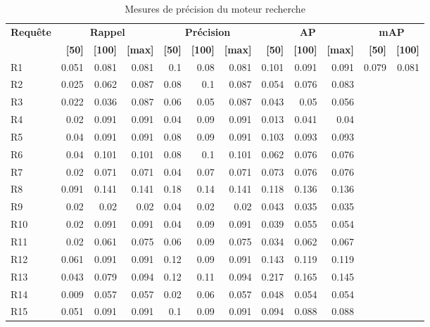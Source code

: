 \begin{table}[H]
\centering
\begin{tabular}{l|rrr|rrr|rrr|rr}
\toprule
\textbf{Requête} & \multicolumn{3}{c}{\textbf{Rappel}} & \multicolumn{3}{c}{\textbf{Précision}} & \multicolumn{3}{c}{\textbf{AP}} & \multicolumn{2}{c}{\textbf{mAP}} \\
 & \textbf{[50]} & \textbf{[100]} & \textbf{[max]} & \textbf{[50]} & \textbf{[100]} & \textbf{[max]} & \textbf{[50]} & \textbf{[100]} & \textbf{[max]} & \textbf{[50]} & \textbf{[100]} \\
\midrule
R1 & 0.051 & 0.081 & 0.081 & 0.1 & 0.08 & 0.081 & 0.101 & 0.091 & 0.091 & \multirow{15}{*}{0.079} & \multirow{15}{*}{0.081} \\
R2 & 0.025 & 0.062 & 0.087 & 0.08 & 0.1 & 0.087 & 0.054 & 0.076 & 0.083 \\
R3 & 0.022 & 0.036 & 0.087 & 0.06 & 0.05 & 0.087 & 0.043 & 0.05 & 0.056 \\
R4 & 0.02 & 0.091 & 0.091 & 0.04 & 0.09 & 0.091 & 0.013 & 0.041 & 0.04 \\
R5 & 0.04 & 0.091 & 0.091 & 0.08 & 0.09 & 0.091 & 0.103 & 0.093 & 0.093 \\
R6 & 0.04 & 0.101 & 0.101 & 0.08 & 0.1 & 0.101 & 0.062 & 0.076 & 0.076 \\
R7 & 0.02 & 0.071 & 0.071 & 0.04 & 0.07 & 0.071 & 0.073 & 0.076 & 0.076 \\
R8 & 0.091 & 0.141 & 0.141 & 0.18 & 0.14 & 0.141 & 0.118 & 0.136 & 0.136 \\
R9 & 0.02 & 0.02 & 0.02 & 0.04 & 0.02 & 0.02 & 0.043 & 0.035 & 0.035 \\
R10 & 0.02 & 0.091 & 0.091 & 0.04 & 0.09 & 0.091 & 0.039 & 0.055 & 0.054 \\
R11 & 0.02 & 0.061 & 0.075 & 0.06 & 0.09 & 0.075 & 0.034 & 0.062 & 0.067 \\
R12 & 0.061 & 0.091 & 0.091 & 0.12 & 0.09 & 0.091 & 0.143 & 0.119 & 0.119 \\
R13 & 0.043 & 0.079 & 0.094 & 0.12 & 0.11 & 0.094 & 0.217 & 0.165 & 0.145 \\
R14 & 0.009 & 0.057 & 0.057 & 0.02 & 0.06 & 0.057 & 0.048 & 0.054 & 0.054 \\
R15 & 0.051 & 0.091 & 0.091 & 0.1 & 0.09 & 0.091 & 0.094 & 0.088 & 0.088 \\
\bottomrule
\end{tabular}
\caption{Mesures de précision du moteur recherche}
\label{tab:results}
\end{table}
